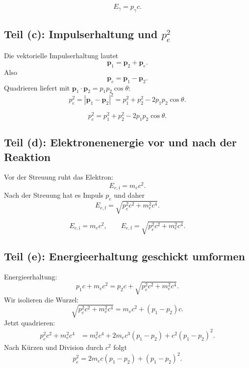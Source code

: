 \documentclass[11pt,a4paper]{scrartcl}
\newcommand{\abs}[1]{\left| #1 \right|}
\newcommand{\vect}[1]{\bm{#1}}
\theoremstyle{definition}
\theoremstyle{plain}
\theoremstyle{remark}
\begin{document}
\begin{answerbox}
\[
    \boxed{E_\gamma=p_\gamma c.}
\]
\end{answerbox}

\subsection{Teil (c): Impulserhaltung und $p_e^2$}

\begin{calculationbox}
Die vektorielle Impulserhaltung lautet
\[
    \vect p_1=\vect p_2+\vect p_e.
\]
Also
\[
    \vect p_e=\vect p_1-\vect p_2.
\]
Quadrieren liefert mit $\vect p_1\cdot\vect p_2=p_1p_2\cos\theta$:
\[
    p_e^2 = \abs{\vect p_1-\vect p_2}^2
          = p_1^2+p_2^2-2p_1p_2\cos\theta.
\]
\end{calculationbox}

\begin{answerbox}
\[
    \boxed{p_e^2=p_1^2+p_2^2-2p_1p_2\cos\theta.}
\]
\end{answerbox}

\subsection{Teil (d): Elektronenenergie vor und nach der Reaktion}

\begin{calculationbox}
Vor der Streuung ruht das Elektron:
\[
    E_{e,\mathrm{i}}=m_ec^2.
\]
Nach der Streuung hat es Impuls $p_e$ und daher
\[
    E_{e,\mathrm{f}}=\sqrt{p_e^2c^2+m_e^2c^4}.
\]
\end{calculationbox}

\begin{answerbox}
\[
    \boxed{E_{e,\mathrm{i}}=m_ec^2,
    \qquad
    E_{e,\mathrm{f}}=\sqrt{p_e^2c^2+m_e^2c^4}.}
\]
\end{answerbox}

\subsection{Teil (e): Energieerhaltung geschickt umformen}

\begin{calculationbox}
Energieerhaltung:
\[
    p_1c+m_ec^2=p_2c+\sqrt{p_e^2c^2+m_e^2c^4}.
\]
Wir isolieren die Wurzel:
\[
    \sqrt{p_e^2c^2+m_e^2c^4}=m_ec^2+(p_1-p_2)c.
\]
Jetzt quadrieren:
\begin{align*}
    p_e^2c^2+m_e^2c^4
    &=m_e^2c^4+2m_ec^3(p_1-p_2)+c^2(p_1-p_2)^2.
\end{align*}
Nach Kürzen und Division durch $c^2$ folgt
\[
    p_e^2=2m_ec(p_1-p_2)+(p_1-p_2)^2.
\]
\end{calculationbox}
\end{document}
